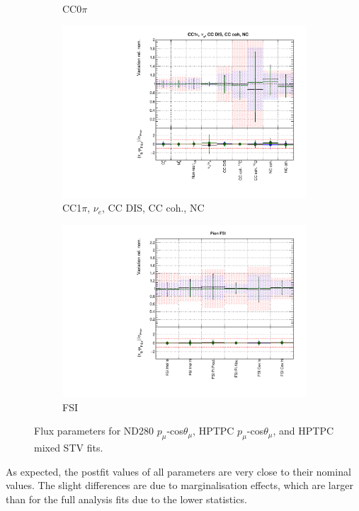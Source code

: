 \begin{figure}[t]
\begin{subfigure}{0.49\textwidth}
  \caption{CC0$\pi$}
\end{subfigure}
\begin{subfigure}{0.49\textwidth}
  \centering
  \includegraphics[width=0.95\linewidth]{figs/hptpcfitsxsec_2}
  \caption{CC1$\pi$, $\nu_e$, CC DIS, CC coh., NC}
\end{subfigure}
\begin{subfigure}{0.49\textwidth}
  \centering
  \includegraphics[width=0.95\linewidth]{figs/hptpcfitsxsec_3}
  \caption{FSI}
\end{subfigure}
\caption{Flux parameters for ND280 $p_{\mu}$-cos$\theta_{\mu}$, HPTPC $p_{\mu}$-cos$\theta_{\mu}$, and HPTPC mixed STV fits.}
\label{fig:hptpcxsec}
\end{figure}

As expected, the postfit values of all parameters are very close to their nominal values. The slight differences are due to marginalisation effects, which are larger than for the full analysis fits due to the lower statistics.


